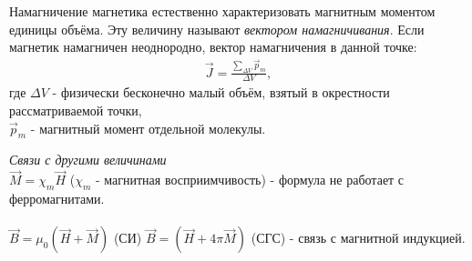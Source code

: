 \documentclass[__main__.tex]{subfiles}
\begin{document}
\begin{definition}[Савельев]
	Намагничение магнетика естественно характеризовать магнитным моментом единицы объёма. Эту величину называют \textit{вектором намагничивания}. Если магнетик намагничен неоднородно, вектор намагничения в данной точке:
	\begin{gather*}
		\vec{J} = \frac{\underset{\Delta V}{\sum}{\vec{p}_m}}{\Delta V},
	\end{gather*}
	где $\Delta V$ - физически бесконечно малый объём, взятый в окрестности рассматриваемой точки,\\
	$\vec{p}_m$ - магнитный момент отдельной молекулы.
\end{definition}
\textit{Связи с другими величинами}\\
$\vec{M} = \chi_m\vec{H}$ ($\chi_m$ - магнитная восприимчивость) -  формула не работает с ферромагнитами.\\\\
$\vec{B} = \mu_0(\vec{H} + \vec{M})$ (СИ) \hspace{0.5cm} $\vec{B} = (\vec{H} + 4\pi\vec{M})$ (СГС) -  связь с магнитной индукцией.
\end{document}
